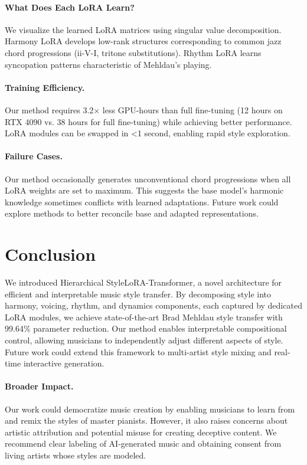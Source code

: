 \documentclass{article}
\begin{document}
\paragraph{What Does Each LoRA Learn?}
We visualize the learned LoRA matrices using singular value decomposition. Harmony LoRA develops low-rank structures corresponding to common jazz chord progressions (ii-V-I, tritone substitutions). Rhythm LoRA learns syncopation patterns characteristic of Mehldau's playing.

\paragraph{Training Efficiency.}
Our method requires 3.2× less GPU-hours than full fine-tuning (12 hours on RTX 4090 vs. 38 hours for full fine-tuning) while achieving better performance. LoRA modules can be swapped in <1 second, enabling rapid style exploration.

\paragraph{Failure Cases.}
Our method occasionally generates unconventional chord progressions when all LoRA weights are set to maximum. This suggests the base model's harmonic knowledge sometimes conflicts with learned adaptations. Future work could explore methods to better reconcile base and adapted representations.

\section{Conclusion}

We introduced Hierarchical StyleLoRA-Transformer, a novel architecture for efficient and interpretable music style transfer. By decomposing style into harmony, voicing, rhythm, and dynamics components, each captured by dedicated LoRA modules, we achieve state-of-the-art Brad Mehldau style transfer with 99.64\% parameter reduction. Our method enables interpretable compositional control, allowing musicians to independently adjust different aspects of style. Future work could extend this framework to multi-artist style mixing and real-time interactive generation.

\paragraph{Broader Impact.}
Our work could democratize music creation by enabling musicians to learn from and remix the styles of master pianists. However, it also raises concerns about artistic attribution and potential misuse for creating deceptive content. We recommend clear labeling of AI-generated music and obtaining consent from living artists whose styles are modeled.



\end{document}
